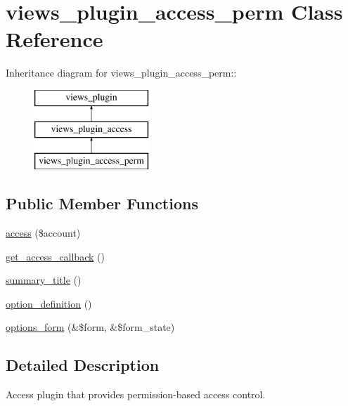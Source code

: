 \hypertarget{classviews__plugin__access__perm}{
\section{views\_\-plugin\_\-access\_\-perm Class Reference}
\label{classviews__plugin__access__perm}
}
Inheritance diagram for views\_\-plugin\_\-access\_\-perm::\begin{figure}[H]
\begin{center}
\leavevmode
\includegraphics[height=3cm]{classviews__plugin__access__perm}
\end{center}
\end{figure}
\subsection*{Public Member Functions}
\begin{DoxyCompactItemize}
\item 
\hyperlink{classviews__plugin__access__perm_ac5b655153815ade74513b1af48c18cad}{access} (\$account)
\item 
\hyperlink{classviews__plugin__access__perm_ac9dce994826265f48711a23cf3f2414f}{get\_\-access\_\-callback} ()
\item 
\hyperlink{classviews__plugin__access__perm_a1e0e33b03ffddf2b98c60740222d8ca5}{summary\_\-title} ()
\item 
\hyperlink{classviews__plugin__access__perm_a7fb275a2bd4c2858064b8d4120ad8f22}{option\_\-definition} ()
\item 
\hyperlink{classviews__plugin__access__perm_af662e29c6b61b1a476b7b9ba368f5650}{options\_\-form} (\&\$form, \&\$form\_\-state)
\end{DoxyCompactItemize}


\subsection{Detailed Description}
Access plugin that provides permission-\/based access control. 

